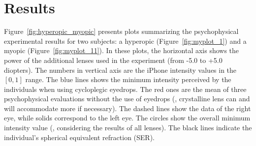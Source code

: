 \section{Results}

Figure~\ref{fig:hyperopic_myopic} presents plots summarizing the psychophysical experimental results for two subjects: a hyperopic (Figure~\ref{fig:myplot_1}) and a myopic (Figure~\ref{fig:myplot_11}). In these plots, the horizontal axis shows the power of the additional lenses used in the experiment (from -5.0 to +5.0 diopters). The numbers in vertical axis are the iPhone intensity values in the $[0,1]$ range.
The blue lines shows the minimum intensity perceived by the individuals when using cycloplegic eyedrops. 
The red ones are the mean of three psychophysical evaluations without the use of eyedrops (\ie, crystalline lens can and will accommodate more if necessary). The dashed lines show the data of the right eye, while solids correspond to the left eye. The circles show the overall minimum intensity value (\ie, considering the results of all lenses). The black lines indicate the individual's spherical equivalent refraction (SER).
%
